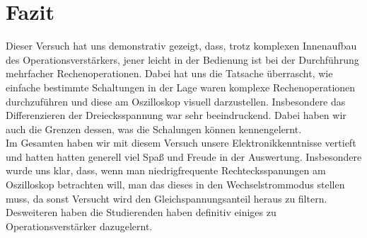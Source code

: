 

\chapter{Fazit}
\label{chap:fazit}

Dieser Versuch hat uns demonstrativ gezeigt, dass, trotz komplexen Innenaufbau des Operationsverstärkers, jener leicht in der Bedienung ist 
bei der Durchführung mehrfacher Rechenoperationen. Dabei hat uns die Tatsache überrascht, wie einfache bestimmte Schaltungen 
in der Lage waren komplexe Rechenoperationen durchzuführen und diese am Oszilloskop visuell darzustellen. Insbesondere das Differenzieren der 
Dreiecksspannung war sehr beeindruckend. Dabei haben wir auch die Grenzen dessen, was die Schalungen können kennengelernt.\\
Im Gesamten haben wir mit diesem Versuch unsere Elektronikkenntnisse vertieft und hatten hatten generell viel Spaß 
und Freude in der Auswertung. Insbesondere wurde uns klar, dass, wenn man niedrigfrequente Rechtecksspanungen am Oszilloskop betrachten will, man das 
dieses in den Wechselstrommodus stellen muss, da sonst Versucht wird den Gleichspannungsanteil heraus zu filtern. 
Desweiteren haben die Studierenden haben definitiv einiges zu Operationsverstärker dazugelernt.